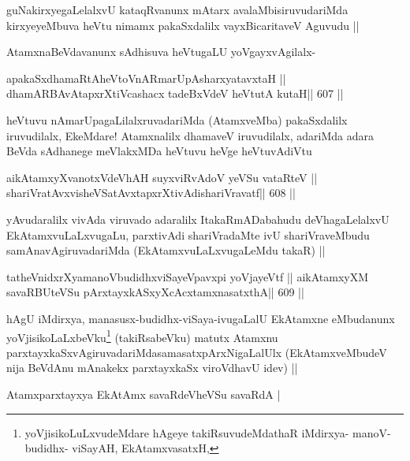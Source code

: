 \begin{artha}
guNakirxyegaLelalxvU kataqRvanunx mAtarx avalaMbisiruvudariMda
kirxyeyeMbuva heVtu nimamx pakaSxdalilx vayxBicaritaveV Aguvudu ||

AtamxnaBeVdavanunx sAdhisuva heVtugaLU yoVgayxvAgilalx-
\end{artha}

\begin{shl}
apakaSxdhamaRtA\footnotemark[4] heVtoVnARmarUpAsharxyatavxtaH ||
dhamARBAvAtapxrXtiVcashacx tadeBxVdeV heVtutA kutaH\hfill || 607 ||
\end{shl}

\begin{artha}
heVtuvu nAmarUpagaLilalxruvadariMda (AtamxveMba) pakaSxdalilx
iruvudilalx, EkeMdare! Atamxnalilx dhamaveV iruvudilalx, adariMda
adara BeVda sAdhanege meVlakxMDa heVtuvu heVge heVtuvAdiVtu
\end{artha}

\begin{shl}
aikAtamxyXvanotxV\footnotemark[1] deVhAH suyxviRvAdoV yeVSu vataRteV ||
shariVratAvxvisheVSatAvxtapxrXtivAdishariVravatf\hfill || 608 ||
\end{shl}

\begin{artha}
yAvudaralilx vivAda viruvado adaralilx ItakaRmADabahudu
deVhagaLelalxvU EkAtamxvuLaLxvugaLu, parxtivAdi shariVradaMte ivU
shariVraveMbudu samAnavAgiruvadariMda (EkAtamxvuLaLxvugaLeMdu takaR) ||
\end{artha}

\begin{shl}
tatheVnidxrXyamanoVbudidhxviSayeVpavxpi yoVjayeVtf ||
aikAtamxyXM savaRBUteVSu pArxtayxkASxyXcAcx\s\s tamxnasatxthA\hfill || 609 ||
\end{shl}

\begin{artha}
hAgU iMdirxya, manasusx-budidhx-viSaya-ivugaLalU EkAtamxne eMbudanunx
yoVjisikoLaLxbeVku\footnote[2]{yoVjisikoLuLxvudeMdare hAgeye
  takiRsuvudeMdathaR iMdirxya- manoV- budidhx- viSayAH, EkAtamxvasatxH,} (takiRsabeVku) matutx Atamxnu
parxtayxkaSxvAgiruvadariMda\footnotemark[2]
samasatx\footnotemark[1]pArxNigaLalUlx (EkAtamxveMbudeV nija BeVdAnu
mAnakekx parxtayxkaSx viroVdhavU idev) ||

Atamxparxtayxya EkAtAmx savaRdeVheVSu savaRdA |
\end{artha}

